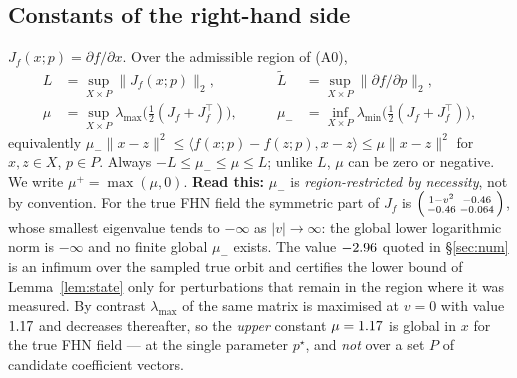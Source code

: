 \documentclass[11pt]{article}
\theoremstyle{remark}\newtheorem{remark}{Remark}
\newcommand{\pstar}{p^\star}
\newcommand{\norm}[1]{\lVert #1\rVert}
\newcommand{\readthis}[1]{\textbf{Read this:} #1}
\begin{document}
\subsection{Constants of the right-hand side}\label{sec:consts}
$J_f(x;p)=\partial f/\partial x$. Over the admissible region of (A0),
\begin{equation}
\begin{aligned}
L&=\sup_{X\times P}\norm{J_f(x;p)}_2, &\qquad
\tilde L&=\sup_{X\times P}\norm{\partial f/\partial p}_2,\\
\mu&=\sup_{X\times P}\lambda_{\max}\!\Big(\tfrac12(J_f+J_f^\top)\Big), &\qquad
\mu_-&=\inf_{X\times P}\lambda_{\min}\!\Big(\tfrac12(J_f+J_f^\top)\Big),
\end{aligned}
\label{eq:mu}
\end{equation}
equivalently $\mu_-\norm{x-z}^2\le\langle f(x;p)-f(z;p),x-z\rangle\le\mu\norm{x-z}^2$ for $x,z\in X$, $p\in P$. Always $-L\le\mu_-\le\mu\le L$; unlike $L$, $\mu$ can be zero or negative. We write $\mu^{+}=\max(\mu,0)$.
\readthis{$\mu_-$ is \emph{region-restricted by necessity}, not by convention. For the true FHN field the symmetric part of $J_f$ is $\begin{psmallmatrix}1-v^2&-0.46\\-0.46&-0.064\end{psmallmatrix}$, whose smallest eigenvalue tends to $-\infty$ as $|v|\to\infty$: the global lower logarithmic norm is $-\infty$ and no finite global $\mu_-$ exists. The value $-2.96$ quoted in \S\ref{sec:num} is an infimum over the sampled true orbit and certifies the lower bound of Lemma~\ref{lem:state} only for perturbations that remain in the region where it was measured. By contrast $\lambda_{\max}$ of the same matrix is maximised at $v=0$ with value $1.17$ and decreases thereafter, so the \emph{upper} constant $\mu=1.17$ is global in $x$ for the true FHN field --- at the single parameter $\pstar$, and \emph{not} over a set $P$ of candidate coefficient vectors.}
\end{document}
